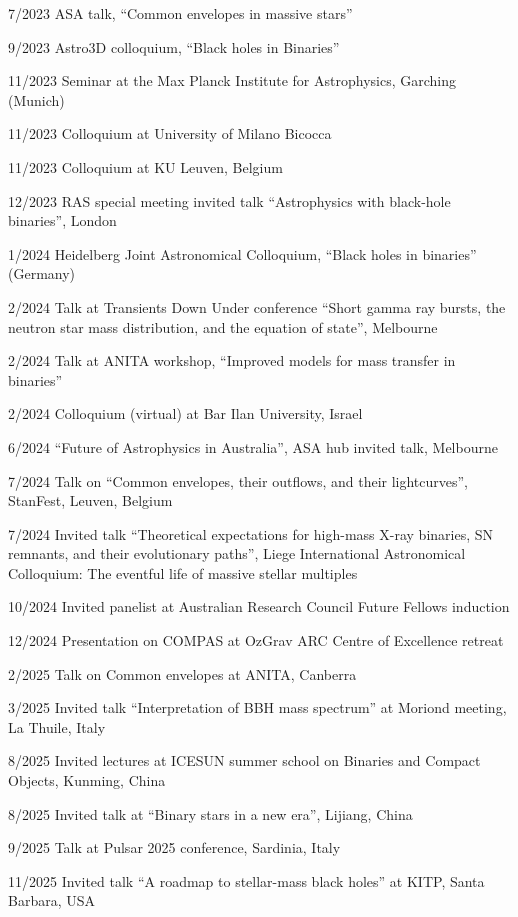 \documentclass[margin,line]{res}
\begin{document}
\begin{resume}
7/2023	ASA talk, ``Common envelopes in massive stars''

9/2023	Astro3D colloquium, ``Black holes in Binaries'' 

11/2023	Seminar at the Max Planck Institute for Astrophysics, Garching (Munich)

11/2023	Colloquium at University of Milano Bicocca

11/2023	Colloquium at KU Leuven, Belgium

12/2023	RAS special meeting invited talk ``Astrophysics with black-hole binaries'', London

1/2024	Heidelberg Joint Astronomical Colloquium, ``Black holes in binaries'' (Germany)

2/2024  	Talk at Transients Down Under conference ``Short gamma ray bursts, the neutron star mass distribution, and the equation of state'', Melbourne

2/2024 	Talk at ANITA workshop, ``Improved models for mass transfer in binaries''

2/2024  	Colloquium (virtual) at Bar Ilan University, Israel

6/2024  	``Future of Astrophysics in Australia'', ASA hub invited talk, Melbourne

7/2024 	Talk on ``Common envelopes, their outflows, and their lightcurves'', StanFest, Leuven, Belgium

7/2024 	Invited talk ``Theoretical expectations for high-mass X-ray binaries, SN remnants, and their evolutionary paths'', Liege International Astronomical Colloquium: The eventful life of massive stellar multiples

10/2024	Invited panelist at Australian Research Council Future Fellows induction

12/2024	Presentation on COMPAS at OzGrav ARC Centre of Excellence retreat

2/2025	Talk on Common envelopes at ANITA, Canberra

3/2025	Invited talk ``Interpretation of BBH mass spectrum'' at Moriond meeting, La Thuile, Italy

8/2025	Invited lectures at ICESUN summer school on Binaries and Compact Objects, Kunming, China

8/2025	Invited talk at ``Binary stars in a new era'', Lijiang, China

9/2025	Talk at Pulsar 2025 conference, Sardinia, Italy

11/2025	Invited talk ``A roadmap to stellar-mass black holes'' at KITP, Santa Barbara, USA


\end{resume}
\end{document}
